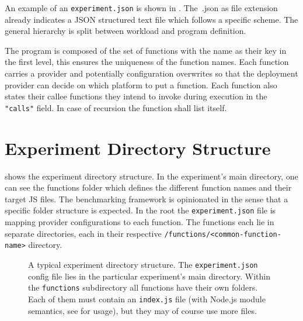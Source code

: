 \documentclass[../main.tex]{subfiles}
\begin{document}
An example of an \texttt{experiment.json} is shown in .
The~.json as file extension already indicates a JSON structured text file which follows a specific scheme. 
The general hierarchy is split between workload and program definition.

The program is  composed of the set of functions with the name as their key in the first level, 
this ensures the uniqueness of the function names. 
Each function carries a provider and potentially configuration overwrites so that the deployment provider can decide 
on which platform to put a function. 
Each function also states their callee functions they intend to invoke during execution in the \texttt{"calls"} field. 
In case of recursion the function shall list itself. 

\section{Experiment Directory Structure}%
\label{sec:experimentDirectoryStructure}

 shows the experiment directory structure.
In the experiment's main directory, one can see the functions folder which defines the different function names and their target JS files. 
The benchmarking framework is opinionated in the sense that a specific folder structure is expected. 
In the root the \texttt{experiment.json} file is mapping provider configurations to each function. 
The functions each lie in separate directories, each in their respective \texttt{/functions/<common-function-name>} directory.

\begin{figure}
\begin{tcolorbox}
\end{tcolorbox}
\caption[Typical Experiment Directory Structure.]{%
  A typical experiment directory structure. The \texttt{experiment.json} config file lies in the particular experiment's main directory.
  Within the \texttt{functions} subdirectory all functions have their own folders. 
  Each of them must contain an \texttt{index.js} file (with Node.js module semantics, see  for usage),
  but they may of course use more files.
}%
\label{fig:experimentDirTree}
\end{figure}
\end{document}
